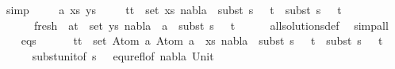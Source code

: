 \begin{isabellebody}
\ simp\isanewline
{}\isamarkupfalse%
\isanewline
\ \ \isamarkupfalse%
\ {\isacharparenleft}{\kern0pt}{}\ a\ xs\ ys{\isacharparenright}{\kern0pt}\isanewline
\ \ \isamarkupfalse%
\ {\isachardoublequoteopen}{\isasymforall}\ {\isacharparenleft}{\kern0pt}t{}{\isacharcomma}{\kern0pt}t{}{\isacharparenright}{\kern0pt}\ {\isasymin}\ set\ xs{\isachardot}{\kern0pt}\ nabla{}\ {\isasymturnstile}\ subst\ {\isacharparenleft}{\kern0pt}s{}\ {\isasymbullet}\ {\isacharbrackleft}{\kern0pt}{\isacharbrackright}{\kern0pt}{\isacharparenright}{\kern0pt}\ t{}\ {\isasymapprox}\ subst\ {\isacharparenleft}{\kern0pt}s{}\ {\isasymbullet}\ {\isacharbrackleft}{\kern0pt}{\isacharbrackright}{\kern0pt}{\isacharparenright}{\kern0pt}\ t{}{\isachardoublequoteclose}\ \isanewline
\ \ \ \ \ \ fresh{\isacharcolon}{\kern0pt}\ {\isachardoublequoteopen}{\isasymforall}\ {\isacharparenleft}{\kern0pt}a{\isacharcomma}{\kern0pt}t{\isacharparenright}{\kern0pt}\ {\isasymin}\ set\ ys{\isachardot}{\kern0pt}\ nabla{}\ {\isasymturnstile}\ a\ {\isasymsharp}\ subst\ {\isacharparenleft}{\kern0pt}s{}\ {\isasymbullet}\ {\isacharbrackleft}{\kern0pt}{\isacharbrackright}{\kern0pt}{\isacharparenright}{\kern0pt}\ t{\isachardoublequoteclose}\isanewline
\ \ \ \ \isamarkupfalse%
\ all{\isacharunderscore}{\kern0pt}solutions{\isacharunderscore}{\kern0pt}def\ \isamarkupfalse%
\ simp{\isacharunderscore}{\kern0pt}all\isanewline
\ \ \isamarkupfalse%
\ eqs{\isacharcolon}{\kern0pt}\ \isanewline
\ \ \ \ {\isachardoublequoteopen}{\isasymforall}\ {\isacharparenleft}{\kern0pt}t{}{\isacharcomma}{\kern0pt}t{}{\isacharparenright}{\kern0pt}\ {\isasymin}\ set\ {\isacharparenleft}{\kern0pt}{\isacharparenleft}{\kern0pt}Atom\ a{\isacharcomma}{\kern0pt}\ Atom\ a{\isacharparenright}{\kern0pt}\ {\isacharhash}{\kern0pt}\ xs{\isacharparenright}{\kern0pt}{\isachardot}{\kern0pt}\ nabla{}\ {\isasymturnstile}\ subst\ {\isacharparenleft}{\kern0pt}s{}\ {\isasymbullet}\ {\isacharbrackleft}{\kern0pt}{\isacharbrackright}{\kern0pt}{\isacharparenright}{\kern0pt}\ t{}\ {\isasymapprox}\ subst\ {\isacharparenleft}{\kern0pt}s{}\ {\isasymbullet}\ {\isacharbrackleft}{\kern0pt}{\isacharbrackright}{\kern0pt}{\isacharparenright}{\kern0pt}\ t{}{\isachardoublequoteclose}\isanewline
\ \ \ \ \isamarkupfalse%
\ subst{\isacharunderscore}{\kern0pt}unit{\isacharbrackleft}{\kern0pt}of\ {\isacartoucheopen}{\isacharparenleft}{\kern0pt}s{}\ {\isasymbullet}\ {\isacharbrackleft}{\kern0pt}{\isacharbrackright}{\kern0pt}{\isacharparenright}{\kern0pt}{\isacartoucheclose}{\isacharbrackright}{\kern0pt}\ equ{\isacharunderscore}{\kern0pt}refl{\isacharbrackleft}{\kern0pt}of\ nabla{}\ Unit{\isacharbrackright}{\kern0pt}\ \isamarkupfalse%

\end{isabellebody}
